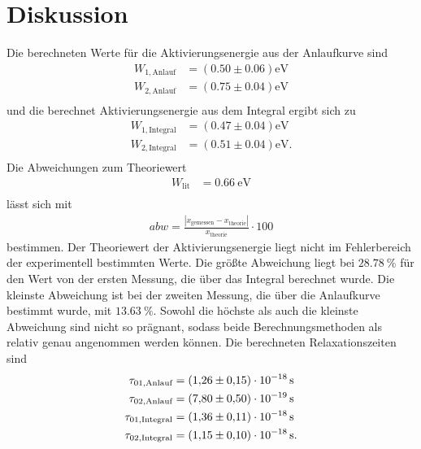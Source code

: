 \section{Diskussion}
\label{sec:Diskussion}
Die berechneten Werte für die Aktivierungsenergie aus der Anlaufkurve sind
\begin{align*}
    W_{1,\text{Anlauf}} &= (0.50 \pm 0.06) \unit{\electronvolt}\\
    W_{2,\text{Anlauf}} &= (0.75 \pm 0.04) \unit{\electronvolt}\\
\end{align*}
und die berechnet Aktivierungsenergie aus dem Integral ergibt sich zu
\begin{align*}
    W_{1,\text{Integral}} &= (0.47 \pm 0.04) \unit{\electronvolt}\\
    W_{2,\text{Integral}} &= (0.51 \pm 0.04)\unit{\electronvolt}.\\
\end{align*} 
Die Abweichungen zum Theoriewert\cite{RMucillo}
\begin{align*}
    W_\text{lit}&= \qty{0.66}{\electronvolt}\\
\end{align*}
lässt sich mit 
\begin{align*}
    abw=\frac{|x_\mathrm{gemessen}-x_\mathrm{theorie}|}{x_\mathrm{theorie}}\cdot 100 \label{eqn:abweich}
\end{align*}
bestimmen.
Der Theoriewert der Aktivierungsenergie liegt nicht im Fehlerbereich der experimentell
bestimmten Werte. Die größte Abweichung liegt bei $\qty{28.78}{\percent}$ für den Wert
von der ersten Messung, die über das Integral berechnet wurde. Die kleinste Abweichung
ist bei der zweiten Messung, die über die Anlaufkurve bestimmt wurde, mit $\qty{13.63}{\percent}$.
Sowohl die höchste als auch die kleinste Abweichung sind nicht so prägnant, sodass beide
Berechnungsmethoden als relativ genau angenommen werden können. 
Die berechneten Relaxationszeiten sind
\begin{align*}
    \tau_{01,\text{Anlauf}} &= \qty{1.26 (15)e-18}{\second}\\ 
    \tau_{02,\text{Anlauf}} &= \qty{7.80 (50)e-19}{\second}\\
    \tau_{01,\text{Integral}} &=\qty{1.36 (11)e-18}{\second}\\
    \tau_{02,\text{Integral}} &=\qty{1.15 (0.10)e-18}{\second}.\\
\end{align*}

